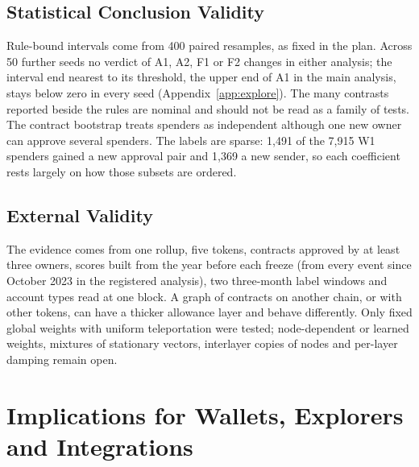 \documentclass{ieeeaccess}
\begin{document}
\subsection{Statistical Conclusion Validity}
Rule-bound intervals come from 400 paired resamples, as fixed in the plan. Across 50 further seeds no verdict of A1, A2, F1 or F2 changes in either analysis; the interval end nearest to its threshold, the upper end of A1 in the main analysis, stays below zero in every seed (Appendix~\ref{app:explore}). The many contrasts reported beside the rules are nominal and should not be read as a family of tests. The contract bootstrap treats spenders as independent although one new owner can approve several spenders. The labels are sparse: 1,491 of the 7,915 W1 spenders gained a new approval pair and 1,369 a new sender, so each coefficient rests largely on how those subsets are ordered.

\subsection{External Validity}
The evidence comes from one rollup, five tokens, contracts approved by at least three owners, scores built from the year before each freeze (from every event since October 2023 in the registered analysis), two three-month label windows and account types read at one block. A graph of contracts on another chain, or with other tokens, can have a thicker allowance layer and behave differently. Only fixed global weights with uniform teleportation were tested; node-dependent or learned weights, mixtures of stationary vectors, interlayer copies of nodes and per-layer damping remain open.

\section{Implications for Wallets, Explorers and Integrations}
\label{sec:implications}
\end{document}
